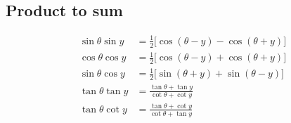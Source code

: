 \subsection*{Product to sum}

\begin{align*}
  \sin \theta \sin y &= \frac{1}{2}\big[\cos(\theta - y) - \cos(\theta + y)\big]\\
  \cos \theta \cos y &= \frac{1}{2}\big[\cos(\theta - y) + \cos(\theta + y)\big]\\
  \sin \theta \cos y &= \frac{1}{2}\big[\sin(\theta + y) + \sin(\theta - y)\big]\\
  \tan \theta \tan y &= \frac{ \tan \theta + \tan y }{ \cot \theta + \cot y }\\
  \tan \theta \cot y &= \frac{ \tan \theta + \cot y }{ \cot \theta + \tan y }
\end{align*}